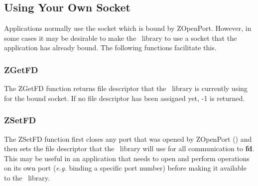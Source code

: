 %
\subsection{Using Your Own Socket}
\label{own-socket}

Applications normally use the socket which is bound
by ZOpenPort.  However, in some cases it may be desirable to
make the \Zephyr\ library to use a socket that the application has
already bound.  The following functions facilitate this.

\subsubsection{ZGetFD}
\label{ZGetFD}

\etemplate
{}

The ZGetFD function returns file descriptor that the
\Zephyr\ library is currently using for the bound socket.  If no file
descriptor has been assigned yet, -1 is returned.

\subsubsection{ZSetFD}
\label{ZSetFD}

\etemplate
{}

The ZSetFD function first closes any port that was opened by ZOpenPort
() and then sets the file descriptor that the
\Zephyr\ library will use for all communication to {\bf fd}.  This may
be useful in an application that needs to open and perform operations
on its own port ({\it e.g.\/} binding a specific port number) before making it
available to the \Zephyr\ library.
